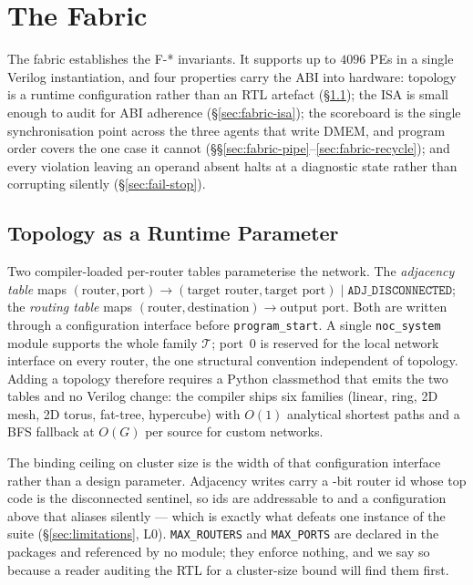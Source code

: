 \documentclass[journal,10pt]{IEEEtran}
\theoremstyle{plain}
\theoremstyle{definition}
\theoremstyle{remark}
\newcommand{\sv}[1]{\texttt{#1}}
\newcommand{\T}{\ensuremath{\mathcal{T}}}
\begin{document}
\section{The Fabric}\label{sec:fabric}

The fabric establishes the \textsf{F-*} invariants. It supports up to $4096$
PEs in a single Verilog instantiation, and four properties carry the ABI into
hardware: topology is a runtime configuration rather than an RTL artefact
(\S\ref{sec:fabric-topo}); the ISA is small enough to audit for ABI adherence
(\S\ref{sec:fabric-isa}); the scoreboard is the single synchronisation point
across the three agents that write DMEM, and program order covers the one case
it cannot (\S\S\ref{sec:fabric-pipe}--\ref{sec:fabric-recycle}); and every
violation leaving an operand absent halts at a diagnostic state rather than
corrupting silently (\S\ref{sec:fail-stop}).

\subsection{Topology as a Runtime Parameter}\label{sec:fabric-topo}

Two compiler-loaded per-router tables parameterise the network. The
\emph{adjacency table} maps $(\text{router},\text{port}) \to (\text{target
router},\text{target port}) \mid \sv{ADJ\_DISCONNECTED}$; the \emph{routing
table} maps $(\text{router},\text{destination}) \to \text{output port}$. Both
are written through a configuration interface before \sv{program\_start}. A
single \sv{noc\_system} module supports the whole family $\T$; port~0 is
reserved for the local network interface on every router, the one structural
convention independent of topology. Adding a topology therefore requires a
Python classmethod that emits the two tables and no Verilog change: the
compiler ships six families (linear, ring, 2D mesh, 2D torus, fat-tree,
hypercube) with $O(1)$ analytical shortest paths and a BFS fallback at $O(G)$
per source for custom networks.

The binding ceiling on cluster size is the width of that configuration
interface rather than a design parameter. Adjacency writes carry a
\RouterIdBits-bit router id whose top code is the disconnected sentinel, so
ids are addressable to \RouterIdMax{} and a configuration above that aliases
silently --- which is exactly what defeats one instance of the suite
(\S\ref{sec:limitations}, L0). \sv{MAX\_ROUTERS} and \sv{MAX\_PORTS} are
declared in the packages and referenced by no module; they enforce nothing,
and we say so because a reader auditing the RTL for a cluster-size bound will
find them first.
\end{document}
